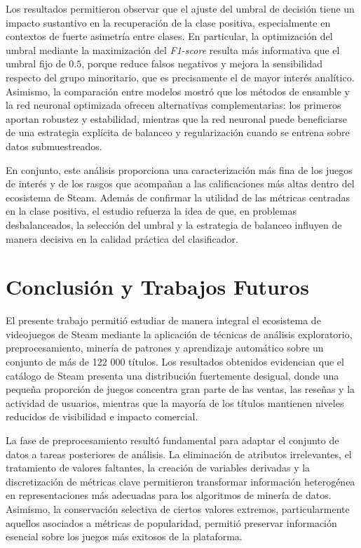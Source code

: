 \documentclass[conference]{IEEEtran}
\begin{document}
Los resultados permitieron observar que el ajuste del umbral de decisión tiene un impacto sustantivo en la recuperación de la clase positiva, especialmente en contextos de fuerte asimetría entre clases. En particular, la optimización del umbral mediante la maximización del \textit{F1-score} resulta más informativa que el umbral fijo de $0.5$, porque reduce falsos negativos y mejora la sensibilidad respecto del grupo minoritario, que es precisamente el de mayor interés analítico. Asimismo, la comparación entre modelos mostró que los métodos de ensamble y la red neuronal optimizada ofrecen alternativas complementarias: los primeros aportan robustez y estabilidad, mientras que la red neuronal puede beneficiarse de una estrategia explícita de balanceo y regularización cuando se entrena sobre datos submuestreados.

En conjunto, este análisis proporciona una caracterización más fina de los juegos de interés y de los rasgos que acompañan a las calificaciones más altas dentro del ecosistema de Steam. Además de confirmar la utilidad de las métricas centradas en la clase positiva, el estudio refuerza la idea de que, en problemas desbalanceados, la selección del umbral y la estrategia de balanceo influyen de manera decisiva en la calidad práctica del clasificador.

\section{Conclusión y Trabajos Futuros}
El presente trabajo permitió estudiar de manera integral el ecosistema de videojuegos de Steam mediante la aplicación de técnicas de análisis exploratorio, preprocesamiento, minería de patrones y aprendizaje automático sobre un conjunto de más de 122 000 títulos. Los resultados obtenidos evidencian que el catálogo de Steam presenta una distribución fuertemente desigual, donde una pequeña proporción de juegos concentra gran parte de las ventas, las reseñas y la actividad de usuarios, mientras que la mayoría de los títulos mantienen niveles reducidos de visibilidad e impacto comercial.

La fase de preprocesamiento resultó fundamental para adaptar el conjunto de datos a tareas posteriores de análisis. La eliminación de atributos irrelevantes, el tratamiento de valores faltantes, la creación de variables derivadas y la discretización de métricas clave permitieron transformar información heterogénea en representaciones más adecuadas para los algoritmos de minería de datos. Asimismo, la conservación selectiva de ciertos valores extremos, particularmente aquellos asociados a métricas de popularidad, permitió preservar información esencial sobre los juegos más exitosos de la plataforma.
\end{document}
